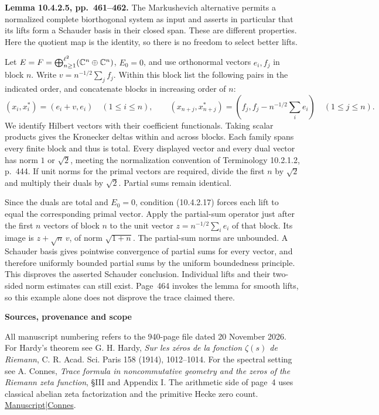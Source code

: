 \documentclass[11pt]{article}
\newcommand{\topic}[1]{\par\medskip\textbf{#1}\par}
\newcommand{\page}[1]{\newpage{\Large\bfseries\color{ink}#1}\par\smallskip}
\begin{document}
\page{A test of the lifting lemma in a Hilbert space}
\textbf{Lemma 10.4.2.5, pp.~461--462.} The Markushevich alternative permits a normalized complete biorthogonal system as input and asserts in particular that its lifts form a Schauder basis in their closed span. These are different properties. Here the quotient map is the identity, so there is no freedom to select better lifts.

Let \(E=F=\bigoplus_{n\ge1}^{\ell^2}(\mathbb C^n\oplus\mathbb C^n)\), \(E_0=0\), and use orthonormal vectors \(e_i,f_j\) in block \(n\). Write \(v=n^{-1/2}\sum_j f_j\). Within this block list the following pairs in the indicated order, and concatenate blocks in increasing order of \(n\):
\[
  (x_i,x_i^*)=(e_i+v,e_i)\quad(1\le i\le n),\qquad
  (x_{n+j},x_{n+j}^*)=(f_j,f_j-n^{-1/2}\textstyle\sum_i e_i)
       \quad(1\le j\le n).
\]
We identify Hilbert vectors with their coefficient functionals. Taking scalar products gives the Kronecker deltas within and across blocks. Each family spans every finite block and thus is total. Every displayed vector and every dual vector has norm \(1\) or \(\sqrt 2\), meeting the normalization convention of Terminology 10.2.1.2, p.~444. If unit norms for the primal vectors are required, divide the first \(n\) by \(\sqrt2\) and multiply their duals by \(\sqrt2\). Partial sums remain identical.

Since the duals are total and \(E_0=0\), condition (10.4.2.17) forces each lift to equal the corresponding primal vector. Apply the partial-sum operator just after the first \(n\) vectors of block \(n\) to the unit vector \(z=n^{-1/2}\sum_i e_i\) of that block. Its image is \(z+\sqrt n\,v\), of norm \(\sqrt{1+n}\). The partial-sum norms are unbounded. A Schauder basis gives pointwise convergence of partial sums for every vector, and therefore uniformly bounded partial sums by the uniform boundedness principle. This disproves the asserted Schauder conclusion. Individual lifts and their two-sided norm estimates can still exist. Page~464 invokes the lemma for smooth lifts, so this example alone does not disprove the trace claimed there.

\topic{Sources, provenance and scope}
All manuscript numbering refers to the 940-page file dated 20 November 2026. For Hardy's theorem see G. H. Hardy, \emph{Sur les zéros de la fonction \(\zeta(s)\) de Riemann}, C. R. Acad. Sci. Paris 158 (1914), 1012--1014. For the spectral setting see A. Connes, \emph{Trace formula in noncommutative geometry and the zeros of the Riemann zeta function}, §III and Appendix I. The arithmetic side of page~4 uses classical abelian zeta factorization and the primitive Hecke zero count. \href{https://math216.wordpress.com/wp-content/uploads/2026/11/the-music-of-the-primes.pdf}{Manuscript}\enspace|\enspace\href{https://arxiv.org/abs/math/9811068}{Connes}.
\end{document}
